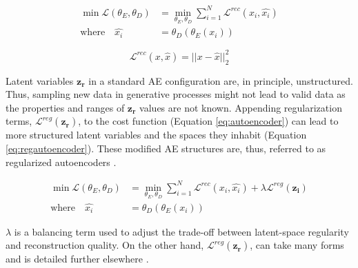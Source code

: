 		\begin{align}
			\min \bm{\mathcal{L}}(\theta_{E}, \theta_{D}) &= \min_{\theta_{E}, \theta_{D}} \sum_{i=1}^{N} \mathcal{L}^{rec}(x_{i}, \hat{x_{i}}) \label{eq:autoencoder} \\ 
			\mathrm{where} \quad \hat{x_{i}} &= \theta_{D}(\theta_{E}(x_{i})) \nonumber
        \end{align}
	
	\begin{equation}
		\mathcal{L}^{rec}(x, \hat{x}) = \vert\vert x - \hat{x} \vert\vert_{2}^{2}
		\label{eq:l2norm}	
	\end{equation}

	Latent variables $\bm{z_{r}}$ in a standard AE configuration are, in principle, unstructured. Thus, sampling new data in generative processes might not lead to valid data as the properties and ranges of $\bm{z_{r}}$ values are not known. Appending regularization terms, $\mathcal{L}^{reg}(\bm{z_{r}})$, to the cost function (Equation \ref{eq:autoencoder}) can lead to more structured latent variables and the spaces they inhabit (Equation \ref{eq:regautoencoder}). These modified AE structures are, thus, referred to as regularized autoencoders \cite{Ehrhardt2022}. 
	
		\begin{align}
			\min \bm{\mathcal{L}}(\theta_{E}, \theta_{D}) &= \min_{\theta_{E}, \theta_{D}} \sum_{i=1}^{N} \mathcal{L}^{rec}(x_{i}, \hat{x_{i}}) + \lambda \mathcal{L}^{reg}(\bm{z_{i}}) \label{eq:regautoencoder} \\ 
			\mathrm{where} \quad \hat{x_{i}} &= \theta_{D}(\theta_{E}(x_{i})) \nonumber
        \end{align}
	
	$\lambda$ is a balancing term used to adjust the trade-off between latent-space regularity and reconstruction quality. On the other hand, $\mathcal{L}^{reg}(\bm{z_{r}})$, can take many forms and is detailed further elsewhere \cite{Ehrhardt2022, pmlr-v48-arpita16}. 
	
